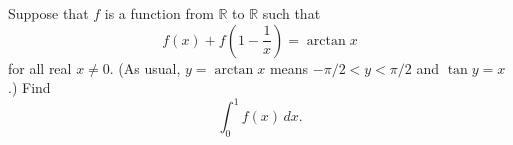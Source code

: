 Suppose that $f$ is a function from $\mathbb{R}$ to $\mathbb{R}$ such that
\[
f(x) + f\left( 1 - \frac{1}{x} \right) = \arctan x
\]
for all real $x \neq 0$. (As usual, $y = \arctan x$ means $-\pi/2 < y < \pi/2$ and $\tan y = x$.) Find 
\[
\int_0^1 f(x)\,dx.
\]
